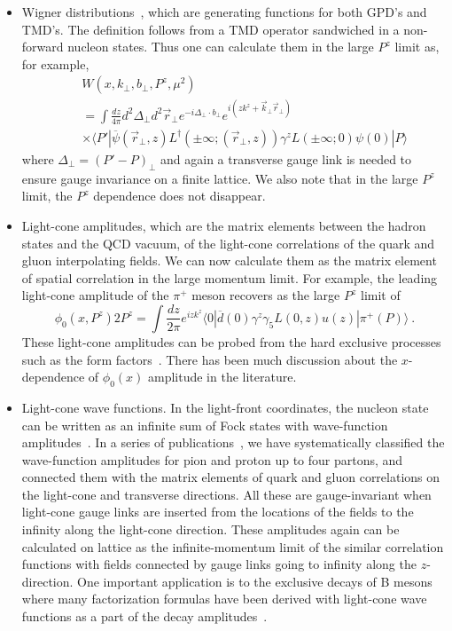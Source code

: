 \begin{itemize}
\item{Wigner distributions~\cite{viewing}, which are generating functions for both GPD's and TMD's.  The definition follows
 from a TMD operator sandwiched in a non-forward nucleon states. Thus one can calculate them in the large $P^z$ limit as, for example,
\begin{eqnarray}
  &&  W(x,k_\perp,b_\perp, P^z, \mu^2) \\ &&
  = \int \frac{dz}{4\pi} d^2\Delta_\perp d^2\vec{r}_\perp e^{-i\Delta_\perp \cdot b_\perp} e^{i(zk^z+\vec{k}_\perp \vec{r}_\perp)}\nonumber
    \\ && \times \langle P'|\overline{\psi}(\vec{r}_\perp,z)L^\dagger(\pm\infty; (\vec{r}_\perp,z))\gamma^z L(\pm\infty; 0)\psi(0) |P\rangle \nonumber
\end{eqnarray}
where $\Delta_\perp =(P'-P)_\perp$ and again a transverse gauge link is needed to ensure gauge invariance on a finite lattice. We also
note that in the large $P^z$ limit, the $P^z$ dependence does not disappear.}

\item{Light-cone amplitudes, which are the matrix elements between the hadron states and the QCD vacuum,
of the light-cone correlations of the quark and gluon interpolating fields. We can now calculate them as
the matrix element of spatial correlation in the large momentum limit. For example, the leading light-cone
amplitude of the $\pi^+$ meson recovers as the large $P^z$ limit of
\begin{equation}
\phi_0(x, P^z) 2P^z = \int \frac{dz}{2\pi} e^{izk^z}
\langle 0|\overline{d}(0)\gamma^z\gamma_5
L(0,z)u(z)| \pi^+(P)\rangle \ .
\end{equation}
These light-cone amplitudes can be probed from the hard exclusive processes such as the
form factors~\cite{Lepage:1980fj,Belitsky:2002kj}.
There has been much discussion about the $x$-dependence of $\phi_0(x)$ amplitude in the literature.}

\item{Light-cone wave functions. In the light-front coordinates, the nucleon state can be
written as an infinite sum of Fock states with wave-function amplitudes~\cite{brodsky}.
In a series of publications~\cite{Ji:2002xn}, we have systematically classified
the wave-function amplitudes for pion and proton up to four partons, and connected them with
the matrix elements of quark and gluon correlations on the light-cone and transverse directions.
All these are gauge-invariant when light-cone gauge links are inserted from the locations of the fields
to the infinity along the light-cone direction. These amplitudes again can be calculated on lattice as
the infinite-momentum limit of the similar correlation functions with fields connected by gauge links
going to infinity along the $z$-direction. One important application is to the exclusive decays
of B mesons where many factorization formulas have been derived with light-cone wave functions
as a part of the decay amplitudes~\cite{li}.}


\end{itemize}

